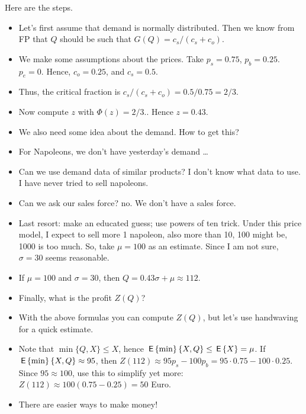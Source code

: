 \begin{question}
   \begin{solution}
Here are the steps.
  \begin{itemize}
  \item Let's first assume that demand is normally distributed. Then
    we know from FP that $Q$ should be such that
    $G(Q) = c_s/(c_s+c_o)$.
  \item We make some assumptions about the prices. Take $p_s=0.75$,
    $p_b = 0.25$. $p_e=0$. Hence, $c_o = 0.25$, and $c_s = 0.5$.
  \item Thus, the critical fraction is $c_s/(c_s+c_o)=0.5/0.75 = 2/3$.
  \item Now compute $z$ with $\Phi(z)=2/3.$. Hence $z=0.43$.
  \item We also need some idea about the demand. How to get this?
  \item For Napoleons, we don't have yesterday's demand \ldots
  \item Can we use demand data of similar products?  I don't know what
    data to use. I have never tried to sell napoleons.
  \item Can we ask our sales force?  no. We don't have a sales force. 
  \item Last resort: make an educated guess; use powers of ten
    trick. Under this price model, I expect to sell more 1 napoleon,
    also more than 10, 100 might be, 1000 is too much. So, take
    $\mu=100$ as an estimate. Since I am not sure, $\sigma=30$ seems
    reasonable.
  \item If $\mu = 100$ and $\sigma = 30$, then $Q=0.43\sigma + \mu \approx 112$.
  \item Finally, what is the profit $Z(Q)$?
\item With the above formulas you can compute $Z(Q)$,  but let's use handwaving for a quick estimate. 
\item Note that $\min\{Q, X\} \leq X$, hence
  $\,\mathsf{E}\left\{\min\right\}\{X, Q\} \leq \,\mathsf{E}\left\{X\right\}= \mu$. If $\,\mathsf{E}\left\{\min\right\}\{X, Q\}\approx 95$,
  then $Z(112) \approx 95p_s - 100 p_b = 95\cdot 0.75 - 100 \cdot 0.25$.
  Since $95\approx100$, use this to simplify yet more:
  $Z(112) \approx 100(0.75-0.25) = 50$ Euro.
\item There are easier ways to make money!
  \end{itemize}
\end{solution}
\end{question}

